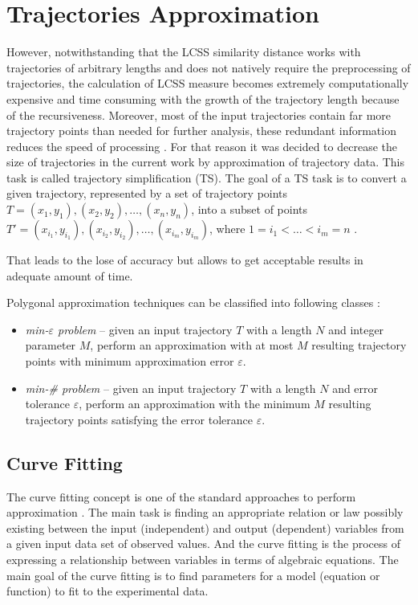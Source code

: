 \section{Trajectories Approximation}

However, notwithstanding that the LCSS similarity distance works with trajectories of arbitrary lengths and does not natively require the preprocessing of trajectories, the calculation of LCSS measure becomes extremely computationally expensive and time consuming with the growth of the trajectory length because of the recursiveness. Moreover, most of the input trajectories contain far more trajectory points than needed for further analysis, these redundant information reduces the speed of processing \cite{article:multir_pol_appr}. For that reason it was decided to decrease the size of trajectories in the current work by approximation of trajectory data. This task is called trajectory simplification (TS). The goal of a TS task is to convert a given trajectory, represented by a set of trajectory points $T = {(x_1, y_1), (x_2, y_2), \ldots, (x_n, y_n)}$, into a subset of points $T' = {(x_{i_1}, y_{i_1}), (x_{i_2}, y_{i_2}), \ldots, (x_{i_m}, y_{i_m})}$, where $1 = i_1 < \ldots < i_m = n$ \cite{article:multir_pol_appr}.

That leads to the lose of accuracy but allows to get acceptable results in adequate amount of time.

Polygonal approximation techniques can be classified into following classes \cite{article:multir_pol_appr}:

\begin{itemize}
	\setlength\itemsep{0em}
	\item \textit{min-$\varepsilon$ problem} -- given an input trajectory $T$ with a length $N$ and integer parameter $M$, perform an approximation with at most $M$ resulting trajectory points with minimum approximation error $\varepsilon$.
	\item \textit{min-\# problem} -- given an input trajectory $T$ with a length $N$ and error tolerance $\varepsilon$, perform an approximation with the minimum $M$ resulting trajectory points satisfying the error tolerance $\varepsilon$.
\end{itemize}

\subsection{Curve Fitting}

The curve fitting concept is one of the standard approaches to perform approximation \cite{article:behav_form_extr}. The main task is finding an appropriate relation or law possibly existing between the input (independent) and output (dependent) variables from a given input data set of observed values. And the curve fitting is the process of expressing a relationship between variables in terms of algebraic equations. The main goal of the curve fitting is to find parameters for a model (equation or function) to fit to the experimental data. 

